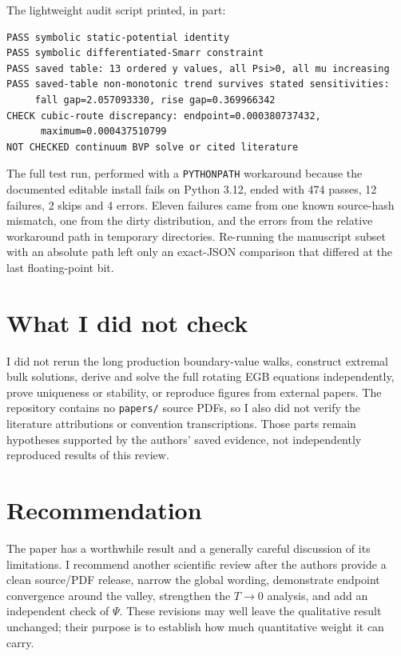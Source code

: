 \documentclass[11pt,a4paper]{article}
\begin{document}
The lightweight audit script printed, in part:

\begin{verbatim}
PASS symbolic static-potential identity
PASS symbolic differentiated-Smarr constraint
PASS saved table: 13 ordered y values, all Psi>0, all mu increasing
PASS saved-table non-monotonic trend survives stated sensitivities:
     fall gap=2.057093330, rise gap=0.369966342
CHECK cubic-route discrepancy: endpoint=0.000380737432,
      maximum=0.000437510799
NOT CHECKED continuum BVP solve or cited literature
\end{verbatim}

The full test run, performed with a \texttt{PYTHONPATH} workaround because the documented editable install fails on Python 3.12, ended with 474 passes, 12 failures, 2 skips and 4 errors.  Eleven failures came from one known source-hash mismatch, one from the dirty distribution, and the errors from the relative workaround path in temporary directories.  Re-running the manuscript subset with an absolute path left only an exact-JSON comparison that differed at the last floating-point bit.

\section*{What I did not check}

I did not rerun the long production boundary-value walks, construct extremal bulk solutions, derive and solve the full rotating EGB equations independently, prove uniqueness or stability, or reproduce figures from external papers.  The repository contains no \texttt{papers/} source PDFs, so I also did not verify the literature attributions or convention transcriptions.  Those parts remain hypotheses supported by the authors' saved evidence, not independently reproduced results of this review.

\section*{Recommendation}

The paper has a worthwhile result and a generally careful discussion of its limitations.  I recommend another scientific review after the authors provide a clean source/PDF release, narrow the global wording, demonstrate endpoint convergence around the valley, strengthen the $T\to0$ analysis, and add an independent check of $\Psi$.  These revisions may well leave the qualitative result unchanged; their purpose is to establish how much quantitative weight it can carry.
\end{document}

